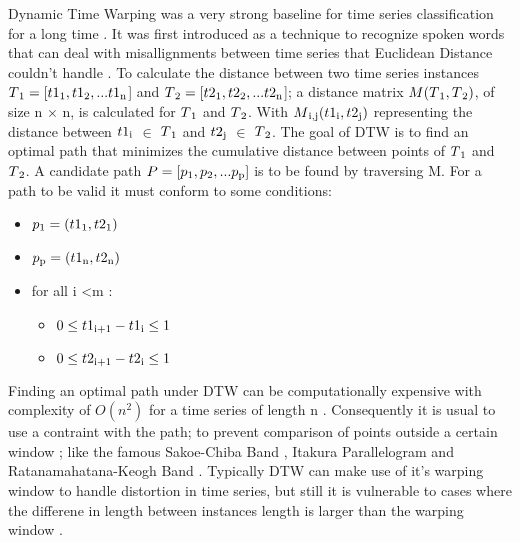 Dynamic Time Warping was a very strong baseline for time series classification for a long time \cite{abanda2019review,bagnall2017great}.
It was first introduced as a technique to recognize spoken words that can deal with misallignments between time series
that Euclidean Distance couldn't handle \cite{tan2020fastee}.\newline
To calculate the distance between two time series instances  $T\textsubscript{1} = [t1\textsubscript{1},t1\textsubscript{2},...t1\textsubscript{n}$]
and $T\textsubscript{2} = [t2\textsubscript{1},t2\textsubscript{2},...t2\textsubscript{n}$];
a distance matrix $M(T\textsubscript{1},T\textsubscript{2})$, of size n $\times$ n, is calculated for $T\textsubscript{1}$ and $T\textsubscript{2}$.
With $M\textsubscript{i,j}(t1\textsubscript{i},t2\textsubscript{j})$ representing the distance between $t1\textsubscript{i}$ $\in$ $T\textsubscript{1}$
and $t2\textsubscript{j}$ $\in$ $T\textsubscript{2}$.
The goal of DTW is to find an optimal path that minimizes the cumulative distance between points of $T\textsubscript{1}$ and $T\textsubscript{2}$.\newline
A candidate path $P = [p\textsubscript{1},p\textsubscript{2},...p\textsubscript{p}]$ is to be found by traversing M.
For a path to be valid it must conform to some conditions:
\begin{itemize}
    \item $p\textsubscript{1} = (t1\textsubscript{1},t2\textsubscript{1})$
    \item $p\textsubscript{p} = (t1\textsubscript{n},t2\textsubscript{n})$
    \item for all i \textless m :
        \begin{itemize}
            \item $0 \leq t1\textsubscript{i+1} - t1\textsubscript{i} \leq 1$
            \item $0 \leq t2\textsubscript{i+1} - t2\textsubscript{i} \leq 1$
        \end{itemize}
\end{itemize}

Finding an optimal path under DTW can be computationally expensive with complexity of $O(n^2)$ for a time series of length n \cite{schafer2017fast,petitjean2016faster}.
Consequently it is usual to use a contraint with the path; to prevent comparison of points outside a certain window \cite{tan2020fastee}; like the famous Sakoe-Chiba Band \cite{sakoe1978dynamic}, Itakura Parallelogram \cite{itakura1975minimum} and Ratanamahatana-Keogh Band \cite{ratanamahatana2004making}.
Typically DTW can make use of it's warping window to handle distortion in time series,
but still it is vulnerable to cases where the differene in length between instances length is larger than the warping window \cite{tan2019time}.
